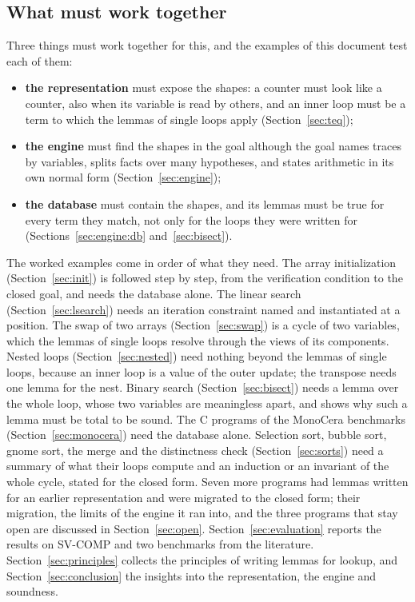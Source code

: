\documentclass[11pt,a4paper]{article}
\begin{document}
\subsection{What must work together}
Three things must work together for this, and the examples of this document test each of them:
\begin{itemize}[nosep]
\item \textbf{the representation} must expose the shapes: a counter must look like a counter, also when its variable
  is read by others, and an inner loop must be a term to which the lemmas of single loops apply
  (Section~\ref{sec:teq});
\item \textbf{the engine} must find the shapes in the goal although the goal names traces by variables, splits facts
  over many hypotheses, and states arithmetic in its own normal form (Section~\ref{sec:engine});
\item \textbf{the database} must contain the shapes, and its lemmas must be true for every term they match, not only
  for the loops they were written for (Sections~\ref{sec:engine:db} and~\ref{sec:bisect}).
\end{itemize}
The worked examples come in order of what they need. The array initialization (Section~\ref{sec:init}) is followed
step by step, from the verification condition to the closed goal, and needs the database alone. The linear search (Section~\ref{sec:lsearch}) needs an iteration
constraint named and instantiated at a position. The swap of two arrays (Section~\ref{sec:swap}) is a cycle of two
variables, which the lemmas of single loops resolve through the views of its components. Nested loops (Section~\ref{sec:nested}) need nothing beyond the
lemmas of single loops, because an inner loop is a value of the outer update; the transpose needs one lemma for the
nest. Binary search (Section~\ref{sec:bisect}) needs a lemma over the whole loop, whose two variables are meaningless
apart, and shows why such a lemma must be total to be sound. The C programs of the MonoCera benchmarks
(Section~\ref{sec:monocera}) need the database alone. Selection sort, bubble sort, gnome sort, the merge and the
distinctness check (Section~\ref{sec:sorts}) need a summary of what their loops compute and an induction or an
invariant of the whole cycle, stated for the closed form. Seven more programs had lemmas written for an earlier
representation and were migrated to the closed form; their migration, the limits of the engine it ran into, and the
three programs that stay open are discussed in Section~\ref{sec:open}. Section~\ref{sec:evaluation} reports the results on
SV-COMP and two benchmarks from the literature. Section~\ref{sec:principles} collects the principles of
writing lemmas for lookup, and Section~\ref{sec:conclusion} the insights into the representation, the engine and
soundness.
\end{document}
